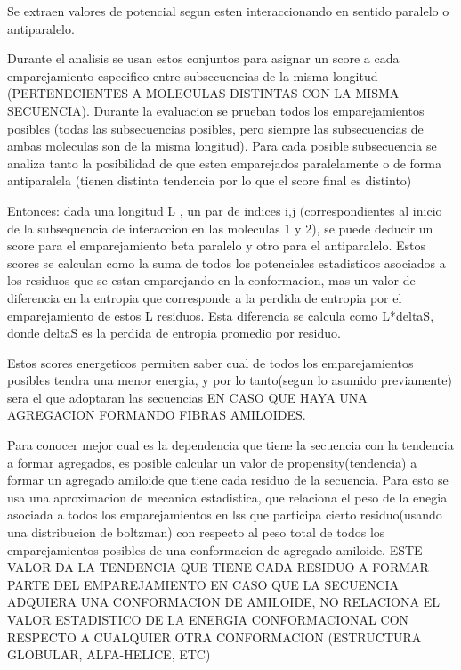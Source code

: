 Se extraen valores de potencial segun esten interaccionando en sentido paralelo o antiparalelo.

Durante el analisis se usan estos conjuntos para asignar un score a cada emparejamiento especifico entre subsecuencias de la misma longitud (PERTENECIENTES A MOLECULAS DISTINTAS CON LA MISMA SECUENCIA). Durante la evaluacion se prueban todos los emparejamientos posibles (todas las subsecuencias posibles, pero siempre las subsecuencias de ambas moleculas son de la misma longitud).
Para cada posible subsecuencia se analiza tanto la posibilidad de que esten emparejados paralelamente o de forma antiparalela (tienen distinta tendencia por lo que el score final es distinto)

Entonces: dada una longitud L , un par de indices i,j (correspondientes al inicio de la subsequencia de interaccion en las moleculas 1 y 2), se puede deducir un score para el emparejamiento beta paralelo y otro para el antiparalelo. Estos scores se calculan como la suma de todos los potenciales estadisticos asociados a los residuos que se estan emparejando en la conformacion, mas un valor de diferencia en la entropia que corresponde a la perdida de entropia por el emparejamiento de estos L residuos. Esta diferencia se calcula como L*deltaS, donde deltaS es la perdida de entropia promedio por residuo.


Estos scores energeticos permiten saber cual de todos los emparejamientos posibles tendra una menor energia, y por lo tanto(segun lo asumido previamente) sera el que adoptaran las secuencias EN CASO QUE HAYA UNA AGREGACION FORMANDO FIBRAS AMILOIDES.



Para conocer mejor cual es la dependencia que tiene la secuencia con la tendencia a formar agregados, es posible calcular un valor de propensity(tendencia) a formar un agregado amiloide que tiene cada residuo de la secuencia. Para esto se usa una aproximacion de mecanica estadistica, que relaciona el peso de la enegia asociada a todos los emparejamientos en lss que participa cierto residuo(usando una distribucion de boltzman) con respecto al peso total de todos los emparejamientos posibles de una conformacion de agregado amiloide. 
ESTE VALOR DA LA TENDENCIA QUE TIENE CADA RESIDUO A FORMAR PARTE DEL EMPAREJAMIENTO EN CASO QUE LA SECUENCIA ADQUIERA UNA CONFORMACION DE AMILOIDE, NO RELACIONA EL VALOR ESTADISTICO DE LA ENERGIA CONFORMACIONAL CON RESPECTO A CUALQUIER OTRA CONFORMACION (ESTRUCTURA GLOBULAR, ALFA-HELICE, ETC)

